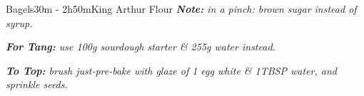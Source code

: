 \documentclass[]{mikescards}
\begin{document}
\begin{recipe}{Bagels}{30m - 2h50m}{King Arthur Flour}
  \textbullet\textit{\textbf{Note:} in a pinch: brown sugar instead of syrup.}

  \textbullet\textit{\textbf{For Tang:} use 100g sourdough starter \& 255g water instead.}

  \textbullet\textit{\textbf{To Top:} brush just-pre-bake with glaze of 1 egg white \& 1TBSP water, and sprinkle seeds.}
\end{recipe}
\end{document}

